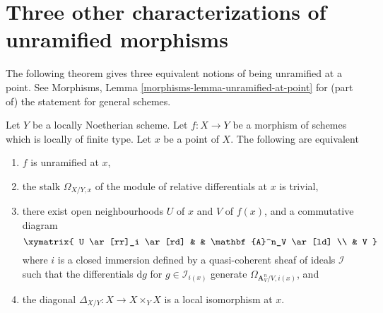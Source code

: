 \section{Three other characterizations of unramified morphisms}
\label{section-three-other}

\noindent
The following theorem gives three equivalent notions of being
unramified at a point. See
Morphisms, Lemma \ref{morphisms-lemma-unramified-at-point}
for (part of) the statement for general schemes.

\begin{theorem}
\label{theorem-unramified-equivalence}
Let $Y$ be a locally Noetherian scheme.
Let $f : X \to Y$ be a morphism of schemes which is locally of finite type.
Let $x$ be a point of $X$. The following are equivalent
\begin{enumerate}
\item $f$ is unramified at $x$,
\item the stalk $\Omega_{X/Y, x}$ of the module of relative differentials
at $x$ is trivial,
\item there exist open neighbourhoods $U$ of $x$ and $V$ of $f(x)$, and a
commutative diagram
$$
\xymatrix{
U \ar[rr]_i \ar[rd] & & \mathbf{A}^n_V \ar[ld] \\
& V
}
$$
where $i$ is a closed immersion defined by a
quasi-coherent sheaf of ideals $\mathcal{I}$ such that the differentials
$\text{d}g$ for $g \in \mathcal{I}_{i(x)}$ generate
$\Omega_{\mathbf{A}^n_V/V, i(x)}$, and
\item the diagonal $\Delta_{X/Y} : X \to X \times_Y X$
is a local isomorphism at $x$.
\end{enumerate}
\end{theorem}

